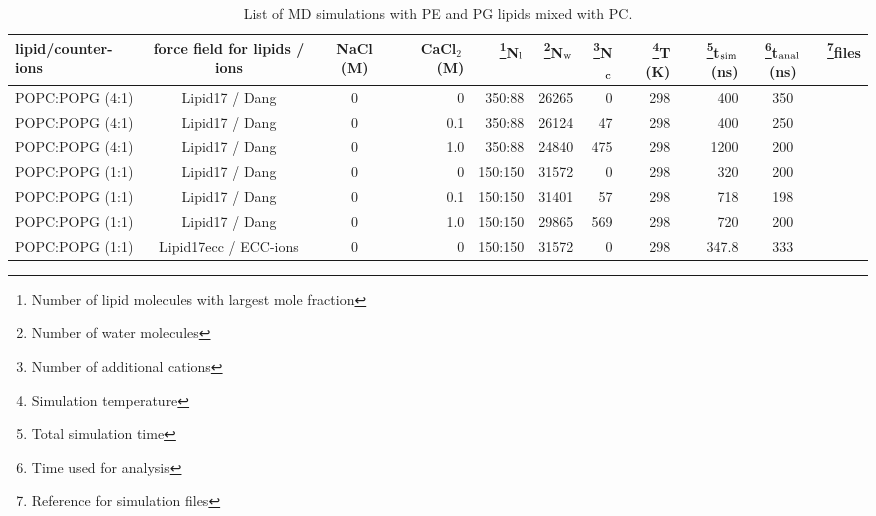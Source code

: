 \documentclass[journal=jpcbfk]{achemso}
\begin{document}
  \begin{sidewaystable*}[!p]
  \centering
  \caption{List of MD simulations with PE and PG lipids mixed with PC.
  }\label{systemsMIX}
  \begin{minipage}[t]{\textwidth}
    \begin{tabular}{l c c r r r r r r c c}
      lipid/counter-ions & force field for lipids / ions & NaCl (M) & CaCl$_2$\,(M) &  \footnote{Number of lipid molecules with largest mole fraction}N$_{\rm l}$   &  \footnote{Number of water molecules}N$_{\rm w}$   & \footnote{Number of additional cations}N$_{\rm c}$  & \footnote{Simulation temperature}T (K)  & \footnote{Total simulation time}t$_{{\rm sim}}$(ns) & \footnote{Time used for analysis}t$_{{\rm anal}}$ (ns) &   \footnote{Reference for simulation files}files\\
      \hline
      POPC:POPG (4:1)        & Lipid17 / Dang \cite{gould18,smith94,dang06}        &0          & 0  & 350:88 & 26265 & 0  &  298  & 400 & 350 & \cite{Lipid17POPCPOPG8020} \\
      POPC:POPG (4:1)        & Lipid17 / Dang \cite{gould18,smith94,dang06}        &0          & 0.1& 350:88 & 26124 & 47 &  298  & 400 & 250 & \cite{Lipid17POPCPOPG8020100mMCaCl} \\
      POPC:POPG (4:1)        & Lipid17 / Dang \cite{gould18,smith94,dang06}        &0          & 1.0& 350:88 & 24840 & 475 &  298  & 1200 & 200 & \cite{Lipid17POPCPOPG80201000mMCaCl} \\
      POPC:POPG (1:1)        & Lipid17 / Dang \cite{gould18,smith94,dang06}        &0          & 0  & 150:150 & 31572 & 0  &  298  & 320 & 200 & \cite{Lipid17POPCPOPG5050} \\
      POPC:POPG (1:1)        & Lipid17 / Dang \cite{gould18,smith94,dang06}        &0          & 0.1& 150:150 & 31401 & 57 &  298  & 718 & 198 & \cite{Lipid17POPCPOPG5050100mMCaCl} \\
      POPC:POPG (1:1)        & Lipid17 / Dang \cite{gould18,smith94,dang06}        &0          & 1.0& 150:150 & 29865 & 569 &  298  & 720 & 200 & \cite{Lipid17POPCPOPG50501000mMCaCl} \\
      \hline
      POPC:POPG (1:1)        & Lipid17ecc / ECC-ions \cite{pluharova14,kohagen16,martinek18}     &0          & 0  & 150:150 & 31572 & 0  &  298  & 347.8 & 333 & \cite{Lipid17eccPOPCPOPG5050} \\

\end{tabular}
\end{minipage}
\end{sidewaystable*}
\end{document}
